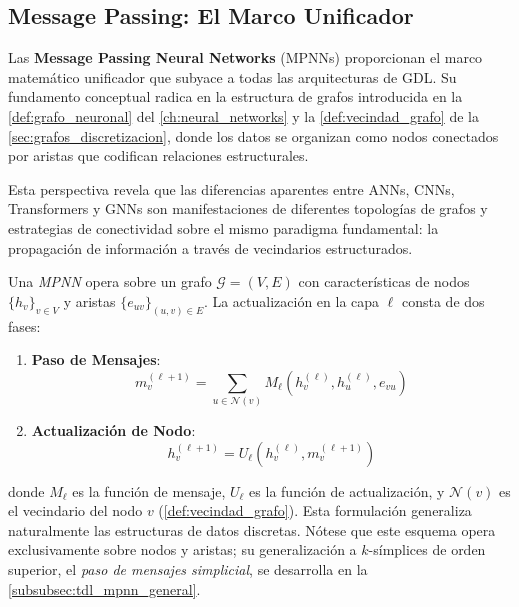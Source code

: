 \subsection{Message Passing: El Marco Unificador}\label{subsec:message_passing_unificador}

Las \textbf{Message Passing Neural Networks} (\glspl{MPNN}) proporcionan el marco matemático unificador que subyace a todas las arquitecturas de \gls{GDL}. Su fundamento conceptual radica en la estructura de grafos introducida en la \autoref{def:grafo_neuronal} del \autoref{ch:neural_networks} y la \autoref{def:vecindad_grafo} de la \autoref{sec:grafos_discretizacion}, donde los datos se organizan como nodos conectados por aristas que codifican relaciones estructurales.

Esta perspectiva revela que las diferencias aparentes entre \glspl{ANN}, \glspl{CNN}, \glspl{Transformer} y \glspl{GNN} son manifestaciones de diferentes topologías de grafos y estrategias de conectividad sobre el mismo paradigma fundamental: la propagación de información a través de vecindarios estructurados.

\begin{definition}\label{def:mpnn_unificador}
Una \textit{\gls{MPNN}} opera sobre un grafo $\mathcal{G} = (V, E)$ con características de nodos $\{h_v\}_{v \in V}$ y aristas $\{e_{uv}\}_{(u,v) \in E}$. La actualización en la capa $\ell$ consta de dos fases:

\begin{enumerate}
    \item \textbf{Paso de Mensajes}:
    \begin{equation}
    m_v^{(\ell+1)} = \sum_{u \in \mathcal{N}(v)} M_\ell(h_v^{(\ell)}, h_u^{(\ell)}, e_{vu})
    \end{equation}
      \item \textbf{Actualización de Nodo}:
    \begin{equation}
    h_v^{(\ell+1)} = U_\ell(h_v^{(\ell)}, m_v^{(\ell+1)})
    \end{equation}
\end{enumerate}

donde $M_\ell$ es la función de mensaje, $U_\ell$ es la función de actualización, y $\mathcal{N}(v)$ es el vecindario del nodo $v$ (\autoref{def:vecindad_grafo}). Esta formulación generaliza naturalmente las estructuras de datos discretas. Nótese que este esquema opera exclusivamente sobre nodos y aristas; su generalización a $k$-símplices de orden superior, el \textit{paso de mensajes simplicial}, se desarrolla en la \autoref{subsubsec:tdl_mpnn_general}.
\end{definition}

